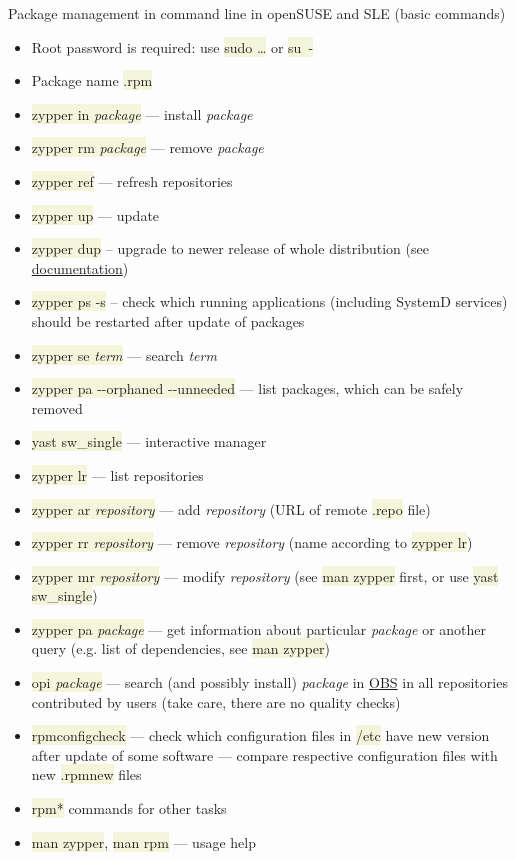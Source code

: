 \documentclass[compress, xelatex, 11pt, xcolor=svgnames, aspectratio=169,
	hyperref={
		bookmarks=true,
		unicode=true,
		colorlinks=true,
		pdftitle={Linux, command line and MetaCentrum},
		plainpages=false,
		pdfauthor={Vojtech Zeisek},
		pdfsubject={Course about use of Linux command line, writing shell scripts and using MetaCentrum of CESNET},
		pdfcreator={XeLaTeX},
		pdfkeywords={Linux, GNU, BASH, shell, command line, MetaCentrum},
		linkcolor=DarkRed, %
		anchorcolor=DarkBlue, %
		citecolor=Indigo, %
		filecolor=NavyBlue, %
		menucolor=DarkMagenta, %
		urlcolor=DarkBlue, %
		},
	url={hyphens, lowtilde} %
	]{beamer}
\renewcommand{\texttt}[1]{\colorbox{Beige}{{\ttfamily #1}}}
\begin{document}
\begin{frame}[allowframebreaks]{Package management in command line in openSUSE and SLE (basic commands)}
	\begin{itemize}
		\item Root password is required: use \texttt{sudo \ldots} or \texttt{su~-}
		\item Package name \texttt{*.rpm}
		\item \texttt{zypper in \textit{package}} --- install \textit{package}
		\item \texttt{zypper rm \textit{package}} --- remove \textit{package}
		\item \texttt{zypper ref} --- refresh repositories
		\item \texttt{zypper up} --- update
		\item \texttt{zypper dup} -- upgrade to newer release of whole distribution (see \href{https://en.opensuse.org/SDB:System_upgrade}{documentation})
		\item \texttt{zypper ps -s} -- check which running applications (including SystemD services) should be restarted after update of packages
		\item \texttt{zypper se \textit{term}} --- search \textit{term}
		\item \texttt{zypper pa -{-}orphaned -{-}unneeded} --- list packages, which can be safely removed
		\item \texttt{yast sw\_single} --- interactive manager
		\item \texttt{zypper lr} --- list repositories
		\item \texttt{zypper ar \textit{repository}} --- add \textit{repository} (URL of remote \texttt{*.repo} file)
		\item \texttt{zypper rr \textit{repository}} --- remove \textit{repository} (name according to \texttt{zypper lr})
		\item \texttt{zypper mr \textit{repository}} --- modify \textit{repository} (see \texttt{man zypper} first, or use \texttt{yast sw\_single})
		\item \texttt{zypper pa \textit{package}} --- get information about particular \textit{package} or another query (e.g. list of dependencies, see \texttt{man zypper})
		\item \texttt{opi \textit{package}} --- search (and possibly install) \textit{package} in \href{https://build.opensuse.org/}{OBS} in all repositories contributed by users (take care, there are no quality checks)
		\item \texttt{rpmconfigcheck} --- check which configuration files in \texttt{/etc} have new version after update of some software --- compare respective configuration files with new \texttt{*.rpmnew} files
		\item \texttt{rpm*} commands for other tasks
		\item \texttt{man zypper}, \texttt{man rpm} --- usage help
	\end{itemize}
\end{frame}
\end{document}
